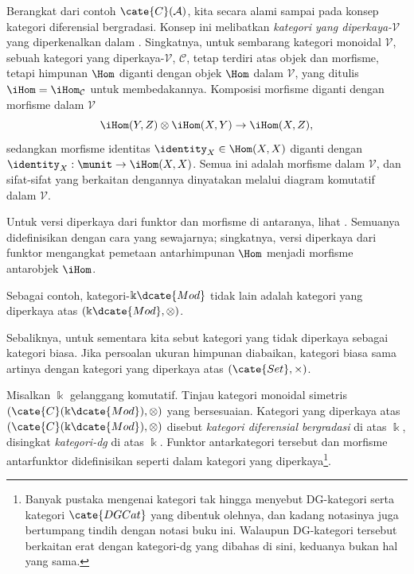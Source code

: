Berangkat dari contoh $\cate{C}(\mathcal{A})$, kita secara alami sampai pada
konsep kategori diferensial bergradasi. Konsep ini melibatkan
\emph{kategori yang diperkaya-$\mathcal{V}$} yang diperkenalkan dalam
\cite[Definisi 3.4.1]{Li1}. Singkatnya, untuk sembarang kategori monoidal
$\mathcal{V}$, sebuah kategori yang diperkaya-$\mathcal{V}$, $\mathcal{C}$,
tetap terdiri atas objek dan morfisme, tetapi himpunan $\Hom$ diganti dengan
objek $\Hom$ dalam $\mathcal{V}$, yang ditulis
$\iHom=\iHom_{\mathcal{C}}$ untuk membedakannya. Komposisi morfisme diganti
dengan morfisme dalam $\mathcal{V}$
\[ \iHom(Y, Z) \otimes \iHom(X, Y) \to \iHom(X, Z), \]
sedangkan morfisme identitas $\identity_X\in\Hom(X,X)$ diganti dengan
$\identity_X:\munit\to\iHom(X,X)$. Semua ini adalah morfisme dalam
$\mathcal{V}$, dan sifat-sifat yang berkaitan dengannya dinyatakan melalui
diagram komutatif dalam $\mathcal{V}$.

Untuk versi diperkaya dari funktor dan morfisme di antaranya, lihat
\cite[Definisi 3.4.1, 3.4.2, 3.4.4]{Li1}. Semuanya didefinisikan dengan cara
yang sewajarnya; singkatnya, versi diperkaya dari funktor mengangkat
pemetaan antarhimpunan $\Hom$ menjadi morfisme antarobjek $\iHom$.

Sebagai contoh, kategori-$\Bbbk\dcate{Mod}$ tidak lain adalah kategori yang
diperkaya atas $(\Bbbk\dcate{Mod},\otimes)$.

Sebaliknya, untuk sementara kita sebut kategori yang tidak diperkaya sebagai
kategori biasa. Jika persoalan ukuran himpunan diabaikan, kategori biasa sama
artinya dengan kategori yang diperkaya atas $(\cate{Set},\times)$.

\begin{definition}\label{def:dgCat}
	Misalkan $\Bbbk$ gelanggang komutatif. Tinjau kategori monoidal simetris
	$(\cate{C}(\Bbbk\dcate{Mod}),\otimes)$ yang bersesuaian. Kategori yang
	diperkaya atas $(\cate{C}(\Bbbk\dcate{Mod}),\otimes)$ disebut
	\emph{kategori diferensial bergradasi} di atas $\Bbbk$, disingkat
	\emph{kategori-dg} di atas $\Bbbk$. Funktor antarkategori tersebut
	dan morfisme antarfunktor didefinisikan seperti dalam kategori yang
	diperkaya\footnote{Banyak pustaka mengenai kategori tak hingga menyebut
	DG-kategori serta kategori $\cate{DGCat}$ yang dibentuk olehnya, dan
	kadang notasinya juga bertumpang tindih dengan notasi buku ini. Walaupun
	DG-kategori tersebut berkaitan erat dengan kategori-dg yang dibahas di
	sini, keduanya bukan hal yang sama.}.
\end{definition}

